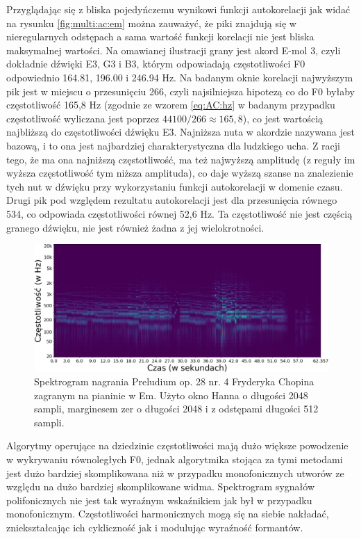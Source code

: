 \documentclass[12pt,a4paper,twoside]{mwart}
\begin{document}
Przyglądając się z bliska pojedyńczemu wynikowi funkcji autokorelacji jak widać na rysunku \ref{fig:multi:ac:em} można zauważyć, że piki znajdują się w nieregularnych odstępach a sama wartość funkcji korelacji nie jest bliska maksymalnej wartości. Na omawianej ilustracji grany jest akord E-mol 3, czyli dokładnie dźwięki E3, G3 i B3, którym odpowiadają częstotliwości F0 odpowiednio 164.81, 196.00 i 246.94 Hz. Na badanym oknie korelacji najwyższym pik jest w miejscu o przesunięciu 266, czyli najsilniejsza hipotezą co do F0 byłaby częstotliwość 165,8 Hz (zgodnie ze wzorem \ref{eq:AC:hz} w badanym przypadku częstotliwość wyliczana jest poprzez $44100 / 266 \approx 165,8$), co jest wartością najbliższą do częstotliwości dźwięku E3. Najniższa nuta w akordzie nazywana jest bazową, i to ona jest najbardziej charakterystyczna dla ludzkiego ucha. Z racji tego, że ma ona najniższą częstotliwość, ma też najwyższą amplitudę (z reguły im wyższa częstotliwość tym niższa amplituda), co daje wyższą szanse na znalezienie tych nut w dźwięku przy wykorzystaniu funkcji autokorelacji w domenie czasu. Drugi pik pod względem rezultatu autokorelacji jest dla przesunięcia równego 534, co odpowiada częstotliwości równej 52,6 Hz. Ta częstotliwość nie jest częścią granego dźwięku, nie jest również żadna z jej wielokrotności.

\begin{figure}[ht]
  \begin{center}
    \includegraphics[scale=0.38]{images/Spectrogram/spectrogram_multi_2048_512_cropped.png}
    \caption{Spektrogram nagrania Preludium op. 28 nr. 4 Fryderyka Chopina zagranym na pianinie w Em. Użyto okno Hanna o długości 2048 sampli, marginesem zer o długości 2048 i z odstępami długości 512 sampli.}
    \label{fig:multi:spectrogram}
  \end{center}
\end{figure}

Algorytmy operujące na dziedzinie częstotliwości mają dużo większe powodzenie w wykrywaniu równoległych F0, jednak algorytmika stojąca za tymi metodami jest dużo bardziej skomplikowana niż w przypadku monofonicznych utworów ze względu na dużo bardziej skomplikowane widma. Spektrogram sygnałów polifonicznych nie jest tak wyraźnym wskaźnikiem jak był w przypadku monofonicznym. Częstotliwości harmonicznych mogą się na siebie nakładać, zniekształcając ich cykliczność jak i modulując wyraźność formantów.
\end{document}
